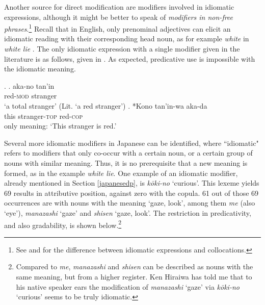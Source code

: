 Another source for direct modification are modifiers involved in idiomatic expressions, although it might be better to speak of \textit{modifiers in non-free phrases}.\footnote{See \citet{melcuk:2012:phraseology} and \citet{kohlich:2024:nonfree} for the difference between idiomatic expressions and collocations.} Recall that in English, only prenominal adjectives can elicit an idiomatic reading with their corresponding head noun, as for example \textit{white} in \textit{white lie} \citep[87–88]{cinque:2010:adj}. The only idiomatic expression with a single modifier given in the literature is as follows, given in \citet[122]{nagano:2015:RA}. As expected, predicative use is impossible with the idiomatic meaning.

\ex. \ag. aka-no tan'in\\
red-\textsc{mod} stranger\\
`a total stranger' (Lit. `a red stranger')
\bg. *Kono tan'in-wa aka-da\\
this stranger-\textsc{top} red-\textsc{cop}\\
only meaning: `This stranger is red.’

Several more idiomatic modifiers in Japanese can be identified, where ``idiomatic" refers to modifiers that only co-occur with a certain noun, or a certain group of nouns with similar meaning. Thus, it is no prerequisite that a new meaning is formed, as in the example \textit{white lie}. One example of an idiomatic modifier, already mentioned in Section \ref{japanesedp}, is \textit{kōki-no} `curious’. This lexeme yields 69 results in attributive position, against zero with the copula. 61 out of those 69 occurrences are with nouns with the meaning `gaze, look’, among them \textit{me} (also `eye'), \textit{manazashi} `gaze' and \textit{shisen} `gaze, look'. The restriction in predicativity, and also gradability, is shown below.\footnote{Compared to \textit{me}, \textit{manazashi} and \textit{shisen} can be described as nouns with the same meaning, but from a higher register. Ken Hiraiwa has told me that to his native speaker ears the modification of \textit{manazashi} `gaze' via \textit{kōki-no} `curious’ seems to be truly idiomatic.} 

